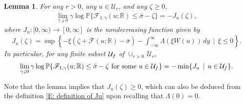 \documentclass[10pt,a4paper]{amsart}
\newtheorem{lemma}{Lemma}
\begin{document}
\begin{lemma} \label{L: basic LDP} For any $r > 0$, any $u \in \mathcal{U}_{r}$, and any $\zeta \geq 0$, 
		\begin{align} \label{E: LDP most basic form}
			\lim_{\gamma \downarrow 0} \gamma \log \mathbb{P} \{ \mathscr{F}_{1,\gamma}(u; \mathbb{R}) \leq \bar{\sigma} - \zeta \} = -J_{u}(\zeta),
		\end{align}
	where $J_{u} : [0,\infty) \to [0,\infty]$ is the nondecreasing function given by 
		\begin{align}\label{E: definition of Ju}
			J_{u}(\zeta) = \sup \left\{ - \xi ( \zeta + \bar{\mathscr{F}}(u; \mathbb{R}) - \bar{\sigma}) - \int_{-\infty}^{\infty} \Lambda ( \xi W(u) ) \, dy \, \mid \, \xi \leq 0 \right\}.
		\end{align}
	In particular, for any finite subset $\mathcal{U}_{ \rm f } $ of $ \cup_{ r > 0 } \, \mathcal{U}_{r}$,
		\begin{align*}
			\lim_{ \gamma \downarrow 0 } \gamma \log \mathbb{P} \{ \mathscr{F}_{1,\gamma} ( u ; \mathbb{R} ) \leq \bar{\sigma} - \zeta \, \, \text{for some} \, \, u \in \mathcal{U}_{ \rm f } \} = - \min \{ J_{u} \, \mid \, u \in \mathcal{U}_{ \rm f } \}.
		\end{align*}
	\end{lemma} 

Note that the lemma implies that $J_{u}(\zeta) \geq 0$, which can also be deduced from the definition \eqref{E: definition of Ju} upon recalling that $\Lambda(0) = 0$.  
\end{document}
